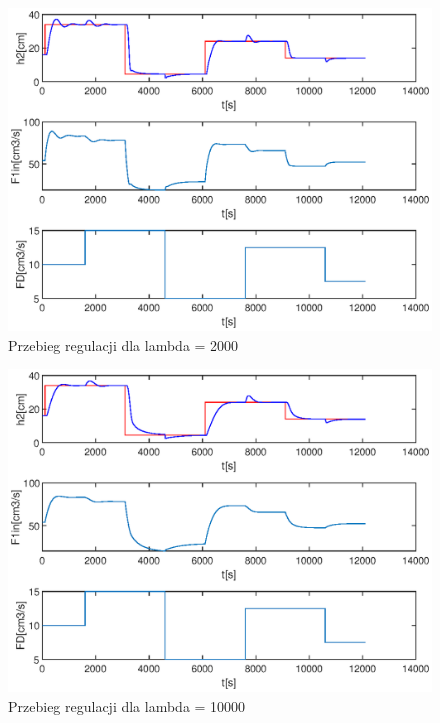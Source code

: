 		\begin{figure}
			\includegraphics[width=0.9\linewidth]{plots/z1_dmc_2000.eps}
			\caption{Przebieg regulacji dla lambda = 2000}
			\label{rys:dmc2000}
		\end{figure}
		
		\begin{figure}
			\includegraphics[width=0.9\linewidth]{plots/z1_dmc_10000.eps}
			\caption{Przebieg regulacji dla lambda = 10000}
			\label{rys:dmc10000}
		\end{figure}
	\newpage